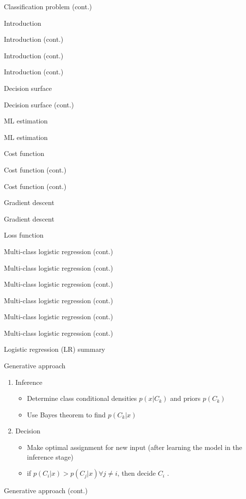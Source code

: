 \documentclass[serif, aspectratio=169]{beamer}
\begin{document}
\begin{frame}{Classification problem (cont.)}
\begin{itemize}
\begin{frame}{Introduction}
\begin{itemize}
\begin{frame}{Introduction (cont.)}
\begin{frame}{Introduction (cont.)}
\begin{frame}{Introduction (cont.)}
\begin{frame}{Decision surface}
\begin{itemize}
\begin{frame}{Decision surface (cont.)}
\begin{frame}{ML estimation}
\begin{frame}{ML estimation}
\begin{itemize}
\begin{frame}{Cost function}
\begin{frame}{Cost function (cont.)}
\begin{itemize}
\begin{itemize}
\begin{frame}{Cost function (cont.)}
\begin{frame}{Gradient descent}
\begin{frame}{Gradient descent}
\begin{frame}{Loss function}
\begin{frame}{Multi-class logistic regression (cont.)}
\begin{frame}{Multi-class logistic regression (cont.)}
\begin{frame}{Multi-class logistic regression (cont.)}
\begin{frame}{Multi-class logistic regression (cont.)}
\begin{frame}{Multi-class logistic regression (cont.)}
\begin{frame}{Multi-class logistic regression (cont.)}
\begin{frame}{Logistic regression (LR) summary}
\begin{itemize}
\begin{frame}{Generative approach}
    \begin{enumerate}
        \item Inference
        \begin{itemize}
            \item Determine class conditional densities $p(x|C_k)$ and priors $p(C_k)$
            \item Use Bayes theorem to find $p(C_k|x)$
        \end{itemize}
        \item Decision
        \begin{itemize}
            \item Make optimal assignment for new input (after learning the model in the inference stage)
            \item if $p(C_i|x) > p(C_j|x) \forall j \neq i$, then decide $C_i$ .
        \end{itemize}
    \end{enumerate}
\end{frame}

\begin{frame}{Generative approach (cont.)}


\end{frame}
\end{itemize}
\end{frame}
\end{frame}
\end{frame}
\end{frame}
\end{frame}
\end{frame}
\end{frame}
\end{frame}
\end{frame}
\end{frame}
\end{frame}
\end{itemize}
\end{itemize}
\end{frame}
\end{frame}
\end{itemize}
\end{frame}
\end{frame}
\end{frame}
\end{itemize}
\end{frame}
\end{frame}
\end{frame}
\end{frame}
\end{itemize}
\end{frame}
\end{itemize}
\end{frame}
\end{document}
